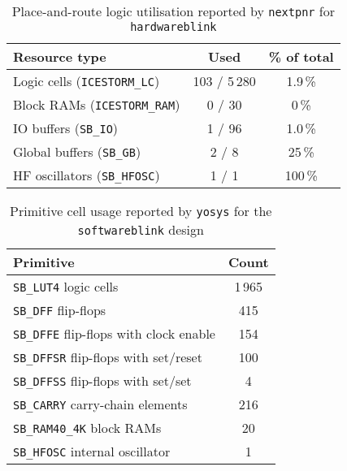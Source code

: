 \documentclass[a4paper,10pt]{article}
\begin{document}
\begin{table}[H]
    \centering
    \begin{tabularx}{0.6\textwidth}{X c c}
        \toprule
        Resource type & Used & \% of total \\ \midrule
        Logic cells (\texttt{ICESTORM\_LC}) & 103 / 5\,280 & 1.9\,\% \\
        Block RAMs (\texttt{ICESTORM\_RAM}) & 0 / 30 & 0\,\% \\
        IO buffers (\texttt{SB\_IO}) & 1 / 96 & 1.0\,\% \\
        Global buffers (\texttt{SB\_GB}) & 2 / 8  & 25\,\% \\
        HF oscillators (\texttt{SB\_HFOSC}) & 1 / 1  & 100\,\% \\ 
    \bottomrule
    \end{tabularx}
    \caption{Place-and-route logic utilisation reported by 
    \texttt{nextpnr} for \texttt{hardwareblink}}
    \label{tab:hardware_pnr_report}
\end{table}

\begin{table}[H]
    \centering
    \begin{tabular}{|l|c|}
        \hline
        \textbf{Primitive} & \textbf{Count} \\
        \hline
        \texttt{SB\_LUT4} logic cells & 1\,965 \\
        \texttt{SB\_DFF} flip-flops & 415 \\
        \texttt{SB\_DFFE} flip-flops with clock enable & 154 \\
        \texttt{SB\_DFFSR} flip-flops with set/reset & 100 \\
        \texttt{SB\_DFFSS} flip-flops with set/set & 4 \\
        \texttt{SB\_CARRY} carry-chain elements & 216 \\
        \texttt{SB\_RAM40\_4K} block RAMs & 20 \\
        \texttt{SB\_HFOSC} internal oscillator & 1 \\
        \hline
    \end{tabular}
    \caption{Primitive cell usage reported by 
    \texttt{yosys} for the \texttt{softwareblink} design}
    \label{tab:software_yosys_report}
\end{table}
\end{document}
